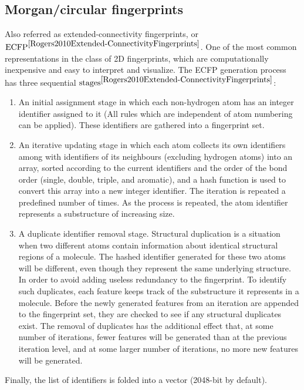 \subsection{Morgan/circular fingerprints}
Also referred as extended-connectivity fingerprints, or $\text{ECFP}^{\cite{Rogers2010Extended-ConnectivityFingerprints}}$.
One of the most common representations in the class of 2D fingerprints, which are 
computationally inexpensive and easy to interpret and visualize.
The ECFP generation process has three sequential $\text{stages}^{\cite{Rogers2010Extended-ConnectivityFingerprints}}$:
\begin{enumerate}
    \item An initial assignment stage in which each non-hydrogen atom has an integer identifier assigned to it (All rules which are independent of atom numbering can be applied).
    These identifiers are gathered into a fingerprint set. 
    \item An iterative updating stage in which each atom collects its own identifiers among with identifiers of its neighbours (excluding hydrogen atoms) into an array, sorted according to the current identifiers and the order of the bond order (single, double, triple, and aromatic), and a hash function is used to convert this array into a new integer identifier.
    The iteration is repeated a predefined number of times. As the process is repeated, 
the atom identifier represents a
    substructure of increasing size.
    \item A duplicate identifier removal stage. Structural duplication is a situation when two different atoms contain information about identical structural regions of a molecule.
    The hashed identifier generated for these two atoms will be different, even 
though they represent the same underlying structure.
    In order to avoid adding useless redundancy to the fingerprint.
    To identify such duplicates, each feature keeps track of the substructure it 
represents in a molecule.
    Before the newly generated features from an iteration are appended to the fingerprint 
set, they are checked to see if any structural duplicates exist.
    The removal of duplicates has the additional effect that, at some number of 
iterations, fewer features will be generated than at the previous iteration level, 
and at some larger number of iterations, no more new features will be generated.
\end{enumerate}
    Finally, the list of identifiers is folded into a vector (2048-bit by default).
\hfill\break\\
